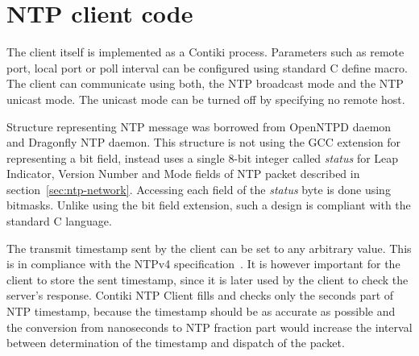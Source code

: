 
\section{NTP client code}
The client itself is implemented as a Contiki process.
Parameters such as remote port, local port or poll interval
can be configured using standard C define macro.
The client can communicate using both,
the NTP broadcast mode and the NTP unicast mode.
The unicast mode can be turned off by specifying no remote host.

Structure representing NTP message was borrowed from OpenNTPD daemon
and Dragonfly NTP daemon.
This structure is not using the GCC extension for representing a bit field,
instead uses a single 8-bit integer called {\it{status}}
for Leap Indicator, Version Number and Mode fields of NTP packet
described in section~\ref{sec:ntp-network}.
Accessing each field of the {\it{status}} byte is done using bitmasks.
Unlike using the bit field extension,
such a design is compliant with the standard C language.





The transmit timestamp sent by the client can be set to any arbitrary value.
This is in compliance with the NTPv4 specification~\cite{rfc5905}.
It is however important for the client to store the sent timestamp,
since it is later used by the client to check the server's response.
Contiki NTP Client fills and checks only the seconds part of NTP timestamp,
because the timestamp should be as accurate as possible and the
conversion from nanoseconds to NTP fraction part would increase the interval
between determination of the timestamp and dispatch of the packet.

